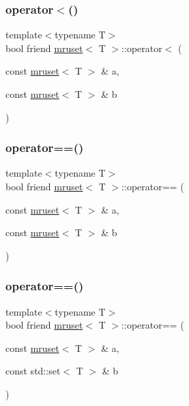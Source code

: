 \mbox{\label{classmruset_a5a95239f76da8ba675ba748baf1f07c8}} 
\subsubsection{\texorpdfstring{operator$<$()}{operator<()}}
{\footnotesize\ttfamily template$<$typename T$>$ \\
bool friend \mbox{\hyperlink{classmruset}{mruset}}$<$ T $>$\+::operator$<$ (\begin{DoxyParamCaption}\item[{const \mbox{\hyperlink{classmruset}{mruset}}$<$ T $>$ \&}]{a,  }\item[{const \mbox{\hyperlink{classmruset}{mruset}}$<$ T $>$ \&}]{b }\end{DoxyParamCaption})\hspace{0.3cm}{\ttfamily [inline]}}

\mbox{\label{classmruset_aced009504f86176bd82426aa24a38e37}} 
\subsubsection{\texorpdfstring{operator==()}{operator==()}\hspace{0.1cm}{\footnotesize\ttfamily [1/2]}}
{\footnotesize\ttfamily template$<$typename T$>$ \\
bool friend \mbox{\hyperlink{classmruset}{mruset}}$<$ T $>$\+::operator== (\begin{DoxyParamCaption}\item[{const \mbox{\hyperlink{classmruset}{mruset}}$<$ T $>$ \&}]{a,  }\item[{const \mbox{\hyperlink{classmruset}{mruset}}$<$ T $>$ \&}]{b }\end{DoxyParamCaption})\hspace{0.3cm}{\ttfamily [inline]}}

\mbox{\label{classmruset_a4d7231441276ef8a6c0fa3edf9712f5c}} 
\subsubsection{\texorpdfstring{operator==()}{operator==()}\hspace{0.1cm}{\footnotesize\ttfamily [2/2]}}
{\footnotesize\ttfamily template$<$typename T$>$ \\
bool friend \mbox{\hyperlink{classmruset}{mruset}}$<$ T $>$\+::operator== (\begin{DoxyParamCaption}\item[{const \mbox{\hyperlink{classmruset}{mruset}}$<$ T $>$ \&}]{a,  }\item[{const std\+::set$<$ T $>$ \&}]{b }\end{DoxyParamCaption})\hspace{0.3cm}{\ttfamily [inline]}}

